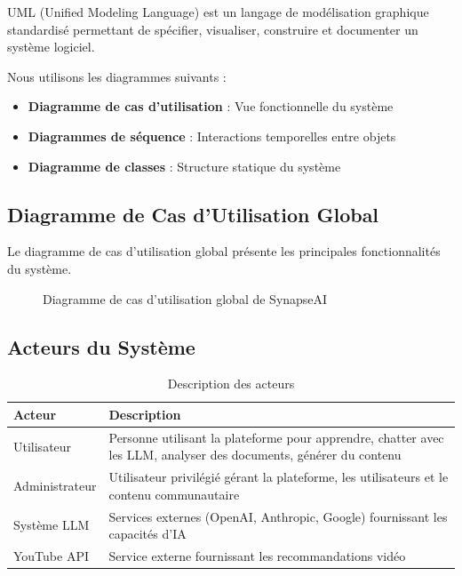 UML (Unified Modeling Language) est un langage de modélisation graphique standardisé permettant de spécifier, visualiser, construire et documenter un système logiciel.

Nous utilisons les diagrammes suivants :
\begin{itemize}
    \item \textbf{Diagramme de cas d'utilisation} : Vue fonctionnelle du système
    \item \textbf{Diagrammes de séquence} : Interactions temporelles entre objets
    \item \textbf{Diagramme de classes} : Structure statique du système
\end{itemize}

\subsection{Diagramme de Cas d'Utilisation Global}

Le diagramme de cas d'utilisation global présente les principales fonctionnalités du système.

\begin{figure}[H]
    \centering
    \caption{Diagramme de cas d'utilisation global de SynapseAI}
    \label{fig:uc-global}
\end{figure}

\subsection{Acteurs du Système}

\begin{table}[H]
\centering
\caption{Description des acteurs}
\label{tab:acteurs}
\begin{tabular}{|l|p{10cm}|}
\hline
\textbf{Acteur} & \textbf{Description} \\
\hline
Utilisateur & Personne utilisant la plateforme pour apprendre, chatter avec les LLM, analyser des documents, générer du contenu \\
\hline
Administrateur & Utilisateur privilégié gérant la plateforme, les utilisateurs et le contenu communautaire \\
\hline
Système LLM & Services externes (OpenAI, Anthropic, Google) fournissant les capacités d'IA \\
\hline
YouTube API & Service externe fournissant les recommandations vidéo \\
\hline
\end{tabular}
\end{table}

